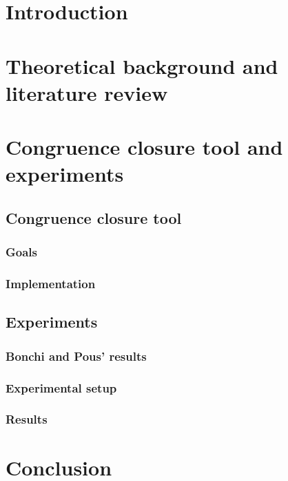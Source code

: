 
\chapter{Introduction}

\chapter{Theoretical background and literature review}



\chapter{Congruence closure tool and experiments}

\section{Congruence closure tool}

\subsection{Goals}

\subsection{Implementation}

\section{Experiments}

\subsection{Bonchi and Pous' results}

\subsection{}

\subsection{Experimental setup}

\subsection{Results}

\chapter{Conclusion}
